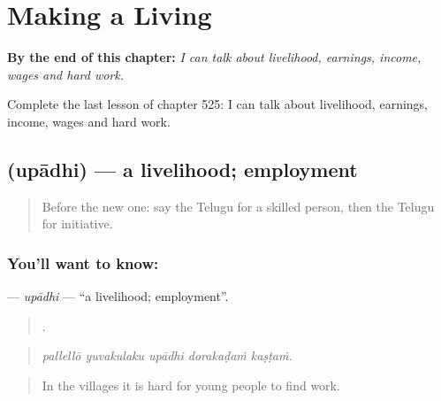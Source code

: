 
\chapter{Making a Living}
\label{ch:te-making-a-living}

\begin{chapteropening}
\textbf{By the end of this chapter:} \emph{I can talk about livelihood, earnings, income, wages and hard work.}

Complete the last lesson of chapter 525: I can talk about livelihood, earnings, income, wages and hard work.
\end{chapteropening}

\section[\texorpdfstring{\te{ఉపాధి} (upādhi)}{ఉపాధి (upādhi)}]{ (upādhi) — a livelihood; employment}

\label{lesson:TE-C525-upadhi}



\begin{quote}
Before the new one: say the Telugu for a skilled person, then the Telugu for initiative.
\end{quote}

\subsection*{You'll want to know: }
\textbf{} — \emph{upādhi} — \textquotedblleft{}a livelihood; employment\textquotedblright{}.

\begin{quote}
    .
\end{quote}

\begin{quote}
\emph{pallellō yuvakulaku upādhi dorakaḍaṁ kaṣṭaṁ.}
\end{quote}

\begin{quote}
In the villages it is hard for young people to find work.
\end{quote}

